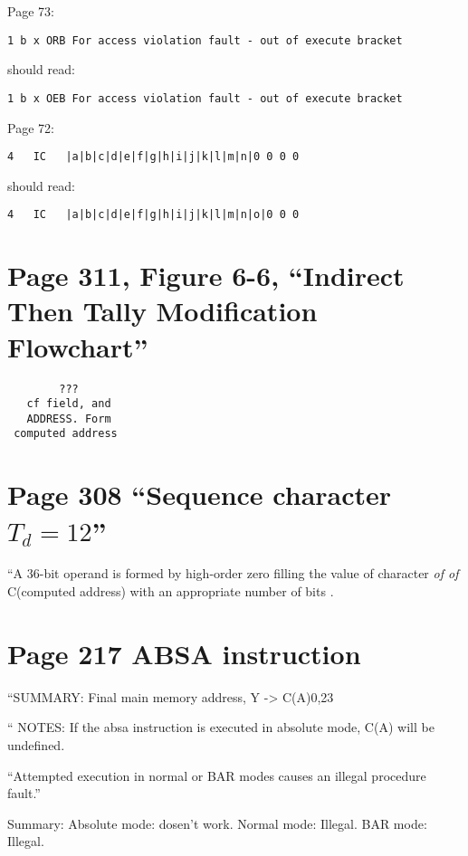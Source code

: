 \documentclass[notitlepage]{report}
\begin{document}
Page 73:

\begin{verbatim}
1 b x ORB For access violation fault - out of execute bracket
\end{verbatim}

should read:

\begin{verbatim}
1 b x OEB For access violation fault - out of execute bracket
\end{verbatim}

Page 72:

\begin{verbatim}
4   IC   |a|b|c|d|e|f|g|h|i|j|k|l|m|n|0 0 0 0
\end{verbatim}

should read:

\begin{verbatim}
4   IC   |a|b|c|d|e|f|g|h|i|j|k|l|m|n|o|0 0 0
\end{verbatim}

\section{Page 311, Figure 6-6, ``Indirect Then Tally Modification Flowchart''}

\begin{verbatim}
        ???
   cf field, and
   ADDRESS. Form
 computed address
\end{verbatim}

\section{Page 308 ``Sequence character $T_d = 12$''}

``A 36-bit operand is formed by high-order zero filling the value of 
character \emph{of of} C(computed address) with an appropriate number of bits .

 
\section{Page 217 ABSA instruction}

``SUMMARY: Final main memory address, Y -> C(A)0,23


`` NOTES: If the absa instruction is executed in absolute mode, C(A) will be
undefined.

``Attempted execution in normal or BAR modes causes an illegal procedure
fault.''

Summary: Absolute mode: dosen't work. Normal mode: Illegal. BAR mode: Illegal.
\end{document}
